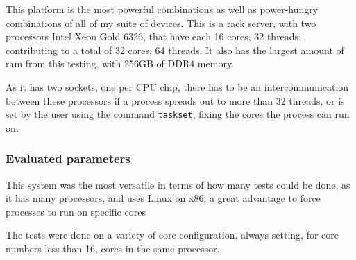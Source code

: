 This platform is the most powerful combinations as well as power-hungry combinations of all of my suite of devices. This is a rack server, with two processors Intel Xeon Gold 6326, that have each 16 cores, 32 threads, contributing to a total of 32 cores, 64 threads. It also has the largest amount of \gls{ram} from this testing, with 256GB of \gls{DDR4} memory.

As it has two sockets, one per CPU chip, there has to be an intercommunication between these processors if a process spreads out to more than 32 threads, or is set by the user using the command \texttt{taskset}, fixing the cores the process can run on.



\subsubsection{Evaluated parameters}
This system was the most versatile in terms of how many  tests could be done, as it has many processors, and uses Linux on x86, a great advantage to force processes to run on specific cores

The tests were done on a variety of core configuration, always setting, for core numbers less than 16, cores in the same processor. 

